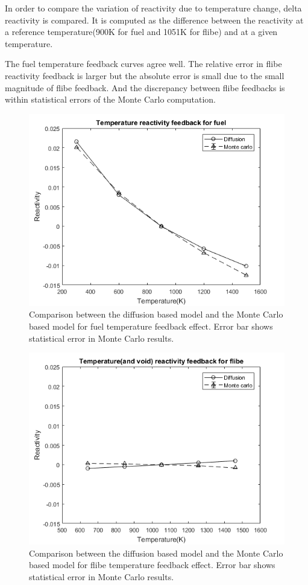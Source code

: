 \documentclass{elsarticle}
\begin{document}
In order to compare the variation of reactivity due to temperature change, delta reactivity is compared. It is computed as the difference between the reactivity at a reference temperature(900K for fuel and 1051K for flibe) and at a given temperature. 

The fuel temperature feedback curves agree well. 
The relative error in flibe reactivity feedback is larger but the absolute error is small due to the small magnitude of flibe feedback. And the discrepancy between flibe feedbacks is within statistical errors of the Monte Carlo computation. 


\begin{figure}[ht]
  \centering
  \includegraphics[width=0.8\columnwidth]{./images/benchmark/feedback_fuel.png}
  \caption{Comparison between the diffusion based model and the Monte Carlo based model for fuel temperature feedback effect. Error bar shows statistical error in Monte Carlo results.} 
  \label{fig:fuel_feedback}
\end{figure}

\begin{figure}[ht]
  \centering
  \includegraphics[width=0.8\columnwidth]{./images/benchmark/feedback_flibe.png}
  \caption{Comparison between the diffusion based model and the Monte Carlo based model for flibe temperature feedback effect. Error bar shows statistical error in Monte Carlo results.} 
  \label{fig:flibe_feedback}
\end{figure}
\end{document}
